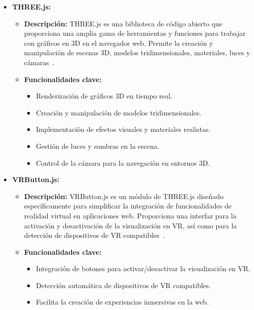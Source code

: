 \documentclass[a4paper, 12pt]{book}
\begin{document}
\begin{itemize}
  \item \textbf{THREE.js:}
    \begin{itemize}
      \item \textbf{Descripción:} THREE.js es una biblioteca de código abierto que proporciona una amplia gama de herramientas y funciones para trabajar 
      con gráficos en 3D en el navegador web. Permite la creación y manipulación de escenas 3D, modelos tridimensionales, materiales, luces y 
      cámaras~\cite{Documentacion_Three.js}.
      \item \textbf{Funcionalidades clave:}
      \begin{itemize}
        \item Renderización de gráficos 3D en tiempo real.
        \item Creación y manipulación de modelos tridimensionales.
        \item Implementación de efectos visuales y materiales realistas.
        \item Gestión de luces y sombras en la escena.
        \item Control de la cámara para la navegación en entornos 3D.
      \end{itemize}
    \end{itemize}
  
\bigskip

  \item \textbf{VRButton.js:}
    \begin{itemize}
      \item \textbf{Descripción:} VRButton.js es un módulo de THREE.js diseñado específicamente para simplificar la integración de funcionalidades de realidad 
      virtual en aplicaciones web. Proporciona una interfaz para la activación y desactivación de la visualización en VR, así como para la detección de dispositivos 
      de VR compatibles~\cite{Documentacion_VR}.
      \item \textbf{Funcionalidades clave:}
      \begin{itemize}
        \item Integración de botones para activar/desactivar la visualización en VR.
        \item Detección automática de dispositivos de VR compatibles.
        \item Facilita la creación de experiencias inmersivas en la web.
      \end{itemize}
    \end{itemize}
  

\end{itemize}
\end{document}
